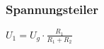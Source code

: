 \subsubsection{Spannungsteiler} 
\begin{minipage}{0.45\textwidth} 
$ U_{1}  = U_{g} \cdot \frac{ R_{1} }{R_{1} +R_{2} } $\\ 
\end{minipage} 
\begin{minipage}{0.45\textwidth} 
 
\end{minipage} 
